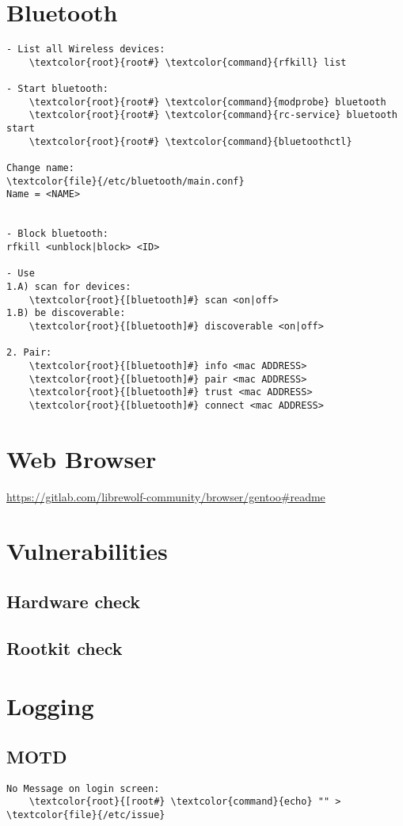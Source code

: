\documentclass[10pt, a4paper, onecolumn, openany]{book}         %
\begin{document}
\section{Bluetooth}
\begin{Verbatim}[commandchars=\\\{\}]
- List all Wireless devices:
    \textcolor{root}{root#} \textcolor{command}{rfkill} list

- Start bluetooth:
    \textcolor{root}{root#} \textcolor{command}{modprobe} bluetooth
    \textcolor{root}{root#} \textcolor{command}{rc-service} bluetooth start
    \textcolor{root}{root#} \textcolor{command}{bluetoothctl}

Change name:
\textcolor{file}{/etc/bluetooth/main.conf}
Name = <NAME>


- Block bluetooth:
rfkill <unblock|block> <ID>

- Use
1.A) scan for devices:
    \textcolor{root}{[bluetooth]#} scan <on|off>
1.B) be discoverable:
    \textcolor{root}{[bluetooth]#} discoverable <on|off>
    
2. Pair:
    \textcolor{root}{[bluetooth]#} info <mac ADDRESS>
    \textcolor{root}{[bluetooth]#} pair <mac ADDRESS>
    \textcolor{root}{[bluetooth]#} trust <mac ADDRESS>
    \textcolor{root}{[bluetooth]#} connect <mac ADDRESS>
\end{Verbatim}


\section{Web Browser}
\url{https://gitlab.com/librewolf-community/browser/gentoo#readme}

\section{Vulnerabilities}
\subsection{Hardware check}
\subsection{Rootkit check}

\section{Logging}
\subsection{MOTD}
\begin{Verbatim}[commandchars=\\\{\}]
No Message on login screen:
    \textcolor{root}{[root#} \textcolor{command}{echo} "" > \textcolor{file}{/etc/issue}
\end{Verbatim}
\end{document}
